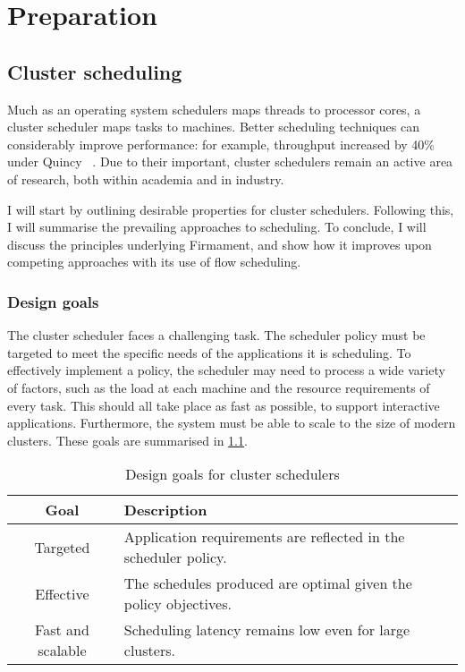 \chapter{Preparation} \label{chap:prep}


\section{Cluster scheduling} \label{sec:prep-scheduling}


Much as an operating system schedulers maps threads to processor cores, a cluster scheduler maps tasks to machines. Better scheduling techniques can considerably improve performance: for example, throughput increased by 40\% under Quincy ~\cite{Isard:2009}. Due to their important, cluster schedulers remain an active area of research, both within academia and in industry.

I will start by outlining desirable properties for cluster schedulers. Following this, I will summarise the prevailing approaches to scheduling. To conclude, I will discuss the principles underlying Firmament, and show how it improves upon competing approaches with its use of flow scheduling.

\subsection{Design goals} \label{sec:prep-scheduling-goals}


The cluster scheduler faces a challenging task. The scheduler policy must be targeted to meet the specific needs of the applications it is scheduling. To effectively implement a policy, the scheduler may need to process a wide variety of factors, such as the load at each machine and the resource requirements of every task. This should all take place as fast as possible, to support interactive applications. Furthermore, the system must be able to scale to the size of modern clusters. These goals are summarised in \cref{table:cluster-scheduler-design-goals}.

\begin{table}
    \begin{tabular}{c|l}
        \textbf{Goal} & \textbf{Description}\tabularnewline
        \hline
        Targeted & Application requirements are reflected in the scheduler policy. \tabularnewline
        Effective & The schedules produced are optimal given the policy objectives. \tabularnewline
        Fast and scalable & Scheduling latency remains low even for large clusters. \tabularnewline
        \hline
    \end{tabular}
    \caption{Design goals for cluster schedulers}
    \label{table:cluster-scheduler-design-goals}
\end{table}

